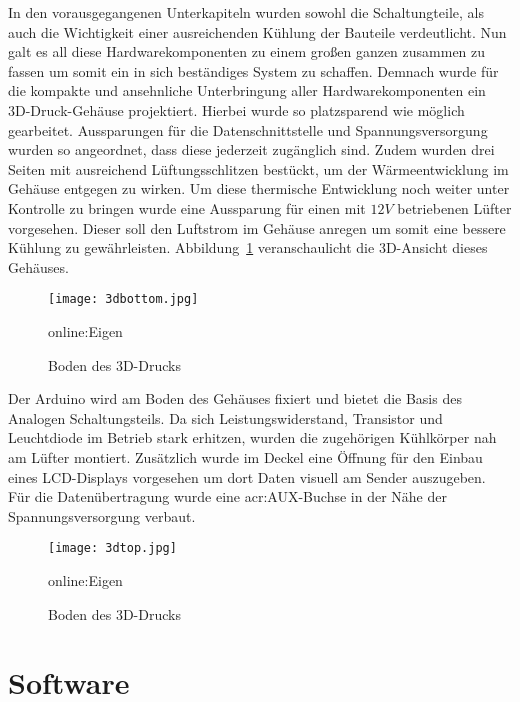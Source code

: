 In den vorausgegangenen Unterkapiteln wurden sowohl die Schaltungteile, als auch die Wichtigkeit einer ausreichenden Kühlung der Bauteile verdeutlicht. Nun galt es all diese Hardwarekomponenten zu einem großen ganzen zusammen zu fassen um somit ein in sich beständiges System zu schaffen. Demnach wurde für die kompakte und ansehnliche Unterbringung aller Hardwarekomponenten ein 3D-Druck-Gehäuse projektiert. Hierbei wurde so platzsparend wie möglich gearbeitet. Aussparungen für die Datenschnittstelle und Spannungsversorgung wurden so angeordnet, dass diese jederzeit zugänglich sind. Zudem wurden drei Seiten mit ausreichend Lüftungsschlitzen bestückt, um der Wärmeentwicklung im Gehäuse entgegen zu wirken. Um diese thermische Entwicklung noch weiter unter Kontrolle zu bringen wurde eine Aussparung für einen mit $12V$ betriebenen Lüfter vorgesehen. Dieser soll den Luftstrom im Gehäuse anregen um somit eine bessere Kühlung zu gewährleisten. Abbildung~\ref{fig:3dbottom} veranschaulicht die 3D-Ansicht dieses Gehäuses.

\begin{figure}[H]
	\centering
	\texttt{[image: 3dbottom.jpg]}
	\caption[Boden des 3D-Drucks]{Boden des 3D-Drucks} \gls{online:Eigen}
	\label{fig:3dbottom}
\end{figure}

Der Arduino wird am Boden des Gehäuses fixiert und bietet die Basis des Analogen Schaltungsteils.
Da sich Leistungswiderstand, Transistor und Leuchtdiode im Betrieb stark erhitzen, wurden die zugehörigen Kühlkörper nah am Lüfter montiert. Zusätzlich wurde im Deckel eine Öffnung für den Einbau eines LCD-Displays vorgesehen um dort Daten visuell am Sender auszugeben. Für die Datenübertragung wurde eine \gls{acr:AUX}-Buchse in der Nähe der Spannungsversorgung verbaut.

\begin{figure}[H]
	\centering
	\texttt{[image: 3dtop.jpg]}
	\caption[Boden des 3D-Drucks]{Boden des 3D-Drucks} \gls{online:Eigen}
	\label{fig:3dtop}
\end{figure}
\newpage
\section{Software}
\label{sec:Software}
